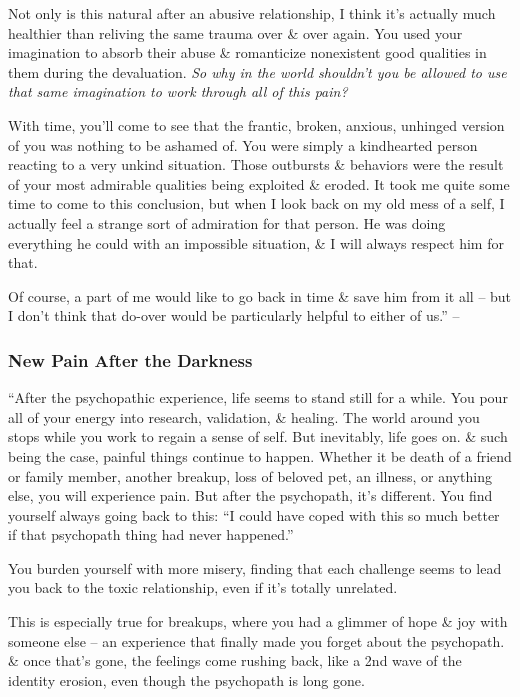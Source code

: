 \documentclass{article}
\numberwithin{equation}{section}
\begin{document}
Not only is this natural after an abusive relationship, I think it's actually much healthier than reliving the same trauma over \& over again. You used your imagination to absorb their abuse \& romanticize nonexistent good qualities in them during the devaluation. \textit{So why in the world shouldn't you be allowed to use that same imagination to work through all of this pain?}

With time, you'll come to see that the frantic, broken, anxious, unhinged version of you was nothing to be ashamed of. You were simply a kindhearted person reacting to a very unkind situation. Those outbursts \& behaviors were the result of your most admirable qualities being exploited \& eroded. It took me quite some time to come to this conclusion, but when I look back on my old mess of a self, I actually feel a strange sort of admiration for that person. He was doing everything he could with an impossible situation, \& I will always respect him for that.

Of course, a part of me would like to go back in time \& save him from it all -- but I don't think that do-over would be particularly helpful to either of us.'' -- \cite[pp. 129--131]{MacKenzie2015}

\subsubsection{New Pain After the Darkness}
``After the psychopathic experience, life seems to stand still for a while. You pour all of your energy into research, validation, \& healing. The world around you stops while you work to regain a sense of self. But inevitably, life goes on. \& such being the case, painful things continue to happen. Whether it be death of a friend or family member, another breakup, loss of beloved pet, an illness, or anything else, you will experience pain. But after the psychopath, it's different. You find yourself always going back to this: ``I could have coped with this so much better if that psychopath thing had never happened.''

You burden yourself with more misery, finding that each challenge seems to lead you back to the toxic relationship, even if it's totally unrelated.

This is especially true for breakups, where you had a glimmer of hope \& joy with someone else -- an experience that finally made you forget about the psychopath. \& once that's gone, the feelings come rushing back, like a 2nd wave of the identity erosion, even though the psychopath is long gone.
\end{document}
